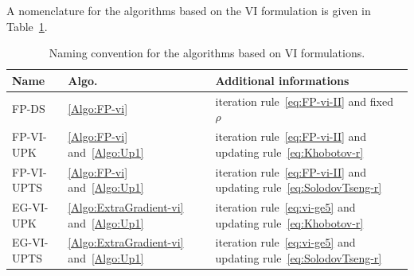 {A nomenclature for the algorithms based on the VI formulation is given in Table~\ref{tab:Projection-algos}.
\begin{table}
  \centering
  \begin{tabular}{|l|l|p{}|}
    \hline
    {Name}
    & Algo.
    & Additional informations
    \\
    \hline
    \hline
    \sf FP-DS
    &  \ref{Algo:FP-vi} & iteration rule~\eqref{eq:FP-vi-II} and fixed $\rho$
    \\
    \hline
    \sf FP-VI-UPK
    &  \ref{Algo:FP-vi} and~\ref{Algo:Up1} & iteration rule~\eqref{eq:FP-vi-II} and updating rule~\eqref{eq:Khobotov-r} 
    \\
    \hline
    \sf FP-VI-UPTS
    &  \ref{Algo:FP-vi} and~\ref{Algo:Up1} & iteration rule~\eqref{eq:FP-vi-II} and  updating rule~\eqref{eq:SolodovTseng-r} 
    \\
    \hline
    \sf EG-VI-UPK
    & \ref{Algo:ExtraGradient-vi} and~\ref{Algo:Up1} & iteration rule~\eqref{eq:vi-ge5} and updating rule~\eqref{eq:Khobotov-r}
    \\
    \hline
    \sf EG-VI-UPTS
    & \ref{Algo:ExtraGradient-vi} and~\ref{Algo:Up1} & iteration rule~\eqref{eq:vi-ge5} and updating rule~\eqref{eq:SolodovTseng-r}
    \\
    \hline
  \end{tabular}
  \caption{Naming convention for the algorithms based on VI formulations.}
  \label{tab:Projection-algos}
\end{table}


}
